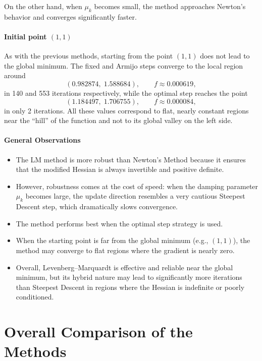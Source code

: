 \documentclass[11pt]{article}
\begin{document}
On the other hand, when $\mu_k$ becomes small, the method approaches Newton's behavior and converges significantly faster.

\paragraph{Initial point $(1,1)$}  
As with the previous methods, starting from the point $(1,1)$ does not lead to the global minimum.  
The fixed and Armijo steps converge to the local region around  
\[
(0.982874,\;1.588684), \qquad f \approx 0.000619,
\]
in 140 and 553 iterations respectively, while the optimal step reaches the point  
\[
(1.184497,\;1.706755), \qquad f \approx 0.000084,
\]
in only 2 iterations.  
All these values correspond to flat, nearly constant regions near the “hill” of the function and not to its global valley on the left side.

\paragraph{General Observations}
\begin{itemize}
    \item The LM method is more robust than Newton’s Method because it ensures that the modified Hessian is always invertible and positive definite.
    
    \item However, robustness comes at the cost of speed: when the damping parameter $\mu_k$ becomes large, the update direction resembles a very cautious Steepest Descent step, which dramatically slows convergence.

    \item The method performs best when the optimal step strategy is used.

    \item When the starting point is far from the global minimum (e.g., $(1,1)$), the method may converge to flat regions where the gradient is nearly zero.

    \item Overall, Levenberg--Marquardt is effective and reliable near the global minimum, but its hybrid nature may lead to significantly more iterations than Steepest Descent in regions where the Hessian is indefinite or poorly conditioned.
\end{itemize}

\section{Overall Comparison of the Methods}
\end{document}
